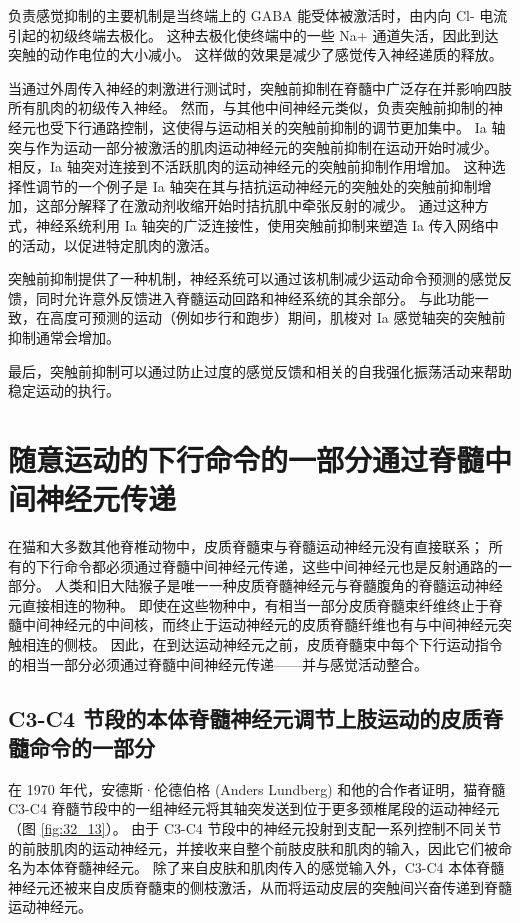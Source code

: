 负责感觉抑制的主要机制是当终端上的 GABA 能受体被激活时，由内向 Cl- 电流引起的初级终端去极化。 这种去极化使终端中的一些 Na+ 通道失活，因此到达突触的动作电位的大小减小。 这样做的效果是减少了感觉传入神经递质的释放。

当通过外周传入神经的刺激进行测试时，突触前抑制在脊髓中广泛存在并影响四肢所有肌肉的初级传入神经。 然而，与其他中间神经元类似，负责突触前抑制的神经元也受下行通路控制，这使得与运动相关的突触前抑制的调节更加集中。 Ia 轴突与作为运动一部分被激活的肌肉运动神经元的突触前抑制在运动开始时减少。 相反，Ia 轴突对连接到不活跃肌肉的运动神经元的突触前抑制作用增加。 这种选择性调节的一个例子是 Ia 轴突在其与拮抗运动神经元的突触处的突触前抑制增加，这部分解释了在激动剂收缩开始时拮抗肌中牵张反射的减少。 通过这种方式，神经系统利用 Ia 轴突的广泛连接性，使用突触前抑制来塑造 Ia 传入网络中的活动，以促进特定肌肉的激活。

突触前抑制提供了一种机制，神经系统可以通过该机制减少运动命令预测的感觉反馈，同时允许意外反馈进入脊髓运动回路和神经系统的其余部分。 与此功能一致，在高度可预测的运动（例如步行和跑步）期间，肌梭对 Ia 感觉轴突的突触前抑制通常会增加。

最后，突触前抑制可以通过防止过度的感觉反馈和相关的自我强化振荡活动来帮助稳定运动的执行。


\section{随意运动的下行命令的一部分通过脊髓中间神经元传递}
在猫和大多数其他脊椎动物中，皮质脊髓束与脊髓运动神经元没有直接联系； 所有的下行命令都必须通过脊髓中间神经元传递，这些中间神经元也是反射通路的一部分。 人类和旧大陆猴子是唯一一种皮质脊髓神经元与脊髓腹角的脊髓运动神经元直接相连的物种。 即使在这些物种中，有相当一部分皮质脊髓束纤维终止于脊髓中间神经元的中间核，而终止于运动神经元的皮质脊髓纤维也有与中间神经元突触相连的侧枝。 因此，在到达运动神经元之前，皮质脊髓束中每个下行运动指令的相当一部分必须通过脊髓中间神经元传递——并与感觉活动整合。

\subsection{C3-C4 节段的本体脊髓神经元调节上肢运动的皮质脊髓命令的一部分}
在 1970 年代，安德斯·伦德伯格 (Anders Lundberg) 和他的合作者证明，猫脊髓 C3-C4 脊髓节段中的一组神经元将其轴突发送到位于更多颈椎尾段的运动神经元（图 \ref{fig:32_13}）。 
由于 C3-C4 节段中的神经元投射到支配一系列控制不同关节的前肢肌肉的运动神经元，并接收来自整个前肢皮肤和肌肉的输入，因此它们被命名为本体脊髓神经元。 除了来自皮肤和肌肉传入的感觉输入外，C3-C4 本体脊髓神经元还被来自皮质脊髓束的侧枝激活，从而将运动皮层的突触间兴奋传递到脊髓运动神经元。

